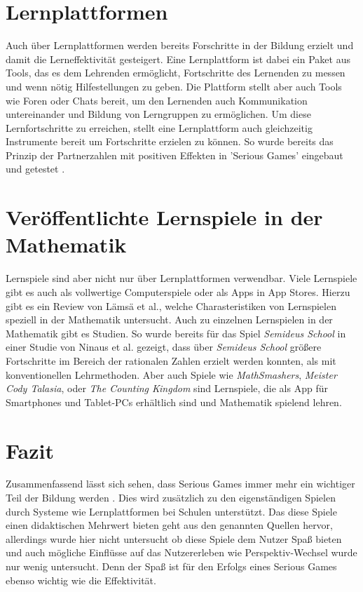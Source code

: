 \section{Lernplattformen}
Auch über Lernplattformen werden bereits Forschritte in der Bildung erzielt und damit die Lerneffektivität gesteigert. Eine Lernplattform ist dabei ein Paket aus Tools, das es dem Lehrenden ermöglicht, Fortschritte des Lernenden zu messen und wenn nötig Hilfestellungen zu geben. Die Plattform stellt aber auch Tools wie Foren oder Chats bereit, um den Lernenden auch Kommunikation untereinander und Bildung von Lerngruppen zu ermöglichen. Um diese Lernfortschritte zu erreichen, stellt eine Lernplattform auch gleichzeitig Instrumente bereit um Fortschritte erzielen zu können. So wurde bereits das Prinzip der Partnerzahlen mit positiven Effekten in 'Serious Games' eingebaut und getestet \cite{JUNG2015}.
\section{Veröffentlichte Lernspiele in der Mathematik}
Lernspiele sind aber nicht nur über Lernplattformen verwendbar. Viele Lernspiele gibt es auch als vollwertige Computerspiele oder als Apps in App Stores. Hierzu gibt es ein Review von Lämsä et al.\cite{Lamsa2018}, welche Charasteristiken von Lernspielen speziell in der Mathematik untersucht. Auch zu einzelnen Lernspielen in der Mathematik gibt es Studien. So wurde bereits für das Spiel \textit{ Semideus School} \cite{semideus} in einer Studie von Ninaus et al.\cite{Ninaus2016} gezeigt, dass über \textit{Semideus School} größere Fortschritte im Bereich der rationalen Zahlen erzielt werden konnten, als mit konventionellen Lehrmethoden. Aber auch Spiele wie \textit{MathSmashers}\cite{ludoscience}, \textit{Meister Cody Talasia}\cite{meisterCody}, oder \textit{The Counting Kingdom}\cite{kingdom} sind Lernspiele, die als App für Smartphones und Tablet-PCs erhältlich sind und Mathematik spielend lehren.
\section{Fazit}
Zusammenfassend lässt sich sehen, dass Serious Games immer mehr ein wichtiger Teil der Bildung werden\cite{Hainey2016} \cite{Boyle2016}. Dies wird zusätzlich zu den eigenständigen Spielen durch Systeme wie Lernplattformen bei Schulen unterstützt. Das diese Spiele einen didaktischen Mehrwert bieten geht aus den genannten Quellen hervor, allerdings wurde hier nicht untersucht ob diese Spiele dem Nutzer Spaß bieten und auch mögliche Einflüsse auf das Nutzererleben wie Perspektiv-Wechsel wurde nur wenig untersucht. Denn der Spaß ist für den Erfolgs eines Serious Games ebenso wichtig wie die Effektivität.